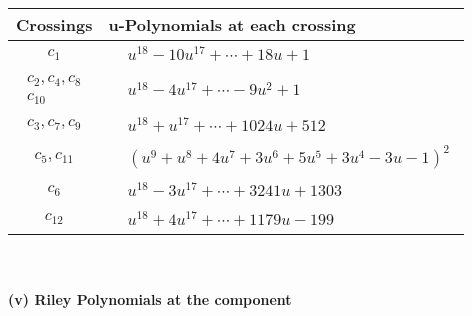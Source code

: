\documentclass[1p]{elsarticle_modified}
\theoremstyle{definition}
\begin{document}
\begin{tabular}{m{50pt}|m{274pt}}
Crossings & \hspace{64pt}u-Polynomials at each crossing \\
\hline $$\begin{aligned}c_{1}\end{aligned}$$&$\begin{aligned}
&u^{18}-10 u^{17}+\cdots+18 u+1
\end{aligned}$\\
\hline $$\begin{aligned}c_{2},c_{4},c_{8}\\c_{10}\end{aligned}$$&$\begin{aligned}
&u^{18}-4 u^{17}+\cdots-9 u^2+1
\end{aligned}$\\
\hline $$\begin{aligned}c_{3},c_{7},c_{9}\end{aligned}$$&$\begin{aligned}
&u^{18}+u^{17}+\cdots+1024 u+512
\end{aligned}$\\
\hline $$\begin{aligned}c_{5},c_{11}\end{aligned}$$&$\begin{aligned}
&(u^9+u^8+4 u^7+3 u^6+5 u^5+3 u^4-3 u-1)^2
\end{aligned}$\\
\hline $$\begin{aligned}c_{6}\end{aligned}$$&$\begin{aligned}
&u^{18}-3 u^{17}+\cdots+3241 u+1303
\end{aligned}$\\
\hline $$\begin{aligned}c_{12}\end{aligned}$$&$\begin{aligned}
&u^{18}+4 u^{17}+\cdots+1179 u-199
\end{aligned}$\\
\hline
\end{tabular}\\~\\
\newpage\renewcommand{\arraystretch}{1}
\flushleft \textbf{(v) Riley Polynomials at the component}\newline \\
\end{document}
